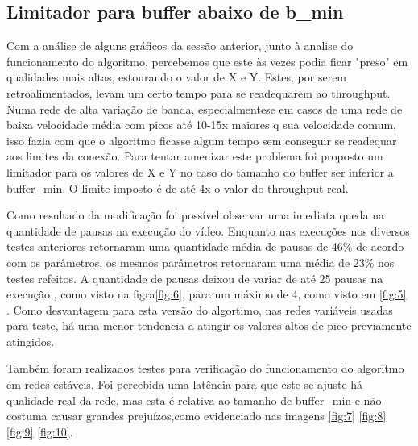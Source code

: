 \documentclass[10pt,twocolumn,letterpaper]{article}
\begin{document}
	\subsection{Limitador para buffer abaixo de b\_min}
	
	Com a análise de alguns gráficos da sessão anterior, junto à analise do funcionamento do algoritmo, percebemos que este às vezes podia ficar "preso" em qualidades mais altas, estourando o valor de X e Y. Estes, por serem retroalimentados, levam um certo tempo para se readequarem ao throughput. Numa rede de alta variação de banda, especialmentese em casos de uma rede de baixa velocidade média com picos até 10-15x maiores q sua velocidade comum, isso fazia com que o algoritmo ficasse algum tempo sem conseguir se readequar aos limites da conexão. Para tentar amenizar este problema foi proposto um limitador para os valores de X e Y no caso do tamanho do buffer ser inferior a buffer\_min. O limite imposto é de até 4x o valor do throughput real.
	
	Como resultado da modificação foi possível observar uma imediata queda na quantidade de pausas na execução do vídeo. Enquanto nas execuções nos diversos testes anteriores retornaram uma quantidade média de pausas de 46\% de acordo com os parâmetros, os mesmos parâmetros retornaram uma média de 23\% nos testes refeitos. A quantidade de pausas deixou de variar de até 25 pausas na execução , como visto na figra\ref{fig:6}, para um máximo de 4, como visto em \ref{fig:5} . Como desvantagem para esta versão do algortimo, nas redes variáveis usadas para teste, há uma menor tendencia a atingir os valores altos de pico previamente atingidos.
	
	Também foram realizados testes para verificação do funcionamento do algoritmo em redes estáveis. Foi percebida uma latência para que este se ajuste há qualidade real da rede, mas esta é relativa ao tamanho de buffer\_min e não costuma causar grandes prejuízos,como evidenciado nas imagens \ref{fig:7} \ref{fig:8} \ref{fig:9} \ref{fig:10}.
	
\end{document}
